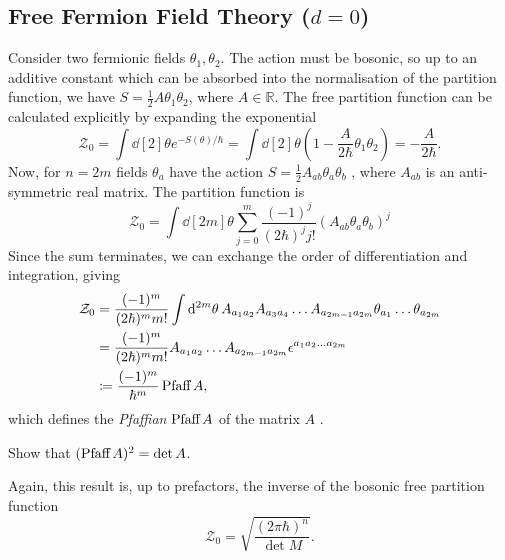 \subsection{Free Fermion Field Theory \texorpdfstring{($d = 0$)}{in Zero Dimensions}}%
\label{sub:free_fermion_field_theory_($d = 0$)_in_zero_dimensions_}

Consider two fermionic fields $\theta_1, \theta_2$. The action must be bosonic, so up to an additive constant which can be absorbed into the normalisation of the partition function, we have $S = \frac{1}{2} A \theta_1 \theta_2$, where $A \in \mathbb{R}$. The free partition function can be calculated explicitly by expanding the exponential
 \begin{equation}
   \mathcal{Z}_0 = \int \dd[2]{\theta} e^{-S(\theta) / \hbar} = \int \dd[2]{\theta} \left( 1- \frac{A}{2 \hbar} \theta_1 \theta_2 \right) = -\frac{A}{2\hbar}.
\end{equation}
Now, for $n = 2m$  fields $\theta_a$  have the action $S = \frac{1}{2}A_{ab} \theta_a \theta_b$ , where $A_{ab}$  is an anti-symmetric real matrix.
The partition function is
\begin{equation}
  \mathcal{Z}_0 = \int \dd[2m]{\theta} \sum_{j = 0}^m \frac{(-1)^j}{(2 \hbar)^j j!} (A_{ab} \theta_a \theta_b)^j
\end{equation}
Since the sum terminates, we can exchange the order of differentiation and integration, giving
\begin{align}
  \mathcal{Z}_0 &= \frac{(-1)^m}{(2 \hbar)^m m!} \int \dd[2m]{\theta} A_{a_1 a_2} A_{a_3 a_4} \dots A_{a_{2m-1} a_{2m}} \theta_{a_1} \dots \theta_{a_{2m}} \\
		&= \frac{(-1)^m}{(2 \hbar)^m m!} A_{a_1 a_2} \dots A_{a_{2m-1} a_{2m}} \epsilon^{a_1 a_2 \dots a_{2m}} \\
		&\coloneqq \frac{(-1)^m}{ \hbar^m} \mathop{\text{Pfaff}\, A},
\end{align}
which defines the \emph{Pfaffian} $\mathop{\text{Pfaff}\, A}$ of the matrix $A$ .
\begin{exercise}
  Show that $(\mathop{\text{Pfaff}\, A})^2 = \det A$.
\end{exercise}
\begin{remark}
  Again, this result is, up to prefactors, the inverse of the bosonic free partition function
  \begin{equation}
    \mathcal{Z}_0 = \sqrt{\frac{(2 \pi \hbar)^n}{\det M}}.
  \end{equation}
\end{remark}

